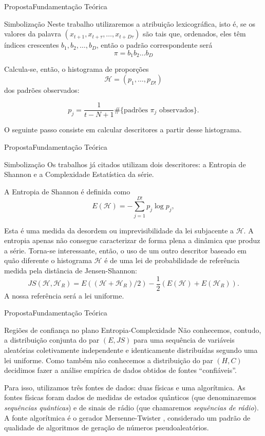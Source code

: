 \documentclass[10pt,xcolor={dvipsnames}]{beamer}
\begin{document}
\begin{frame}{Proposta}{Fundamentação Teórica}
\begin{block}{Simbolização}
	Neste trabalho utilizaremos a atribuição lexicográfica, isto é, se os valores da palavra $(x_{t+1},x_{t+\tau},\ldots, x_{t+D\tau})$ são tais que, ordenados, eles têm índices crescentes $b_1,b_2,\dots,b_D$, então o padrão correspondente será $$\pi=b_1b_2\dots b_D$$
	
	Calcula-se, então, o histograma de proporções $$\mathcal{H} =(p_1,\dots,p_{D!})$$ dos padrões observados:	
	\pause

		$$
		p_j = \frac{1}{t-N+1} \# \{
		\text{padrões } \pi_j \text{ observados}
		\}.
		$$
\pause

	O seguinte passo consiste em calcular descritores a partir desse histograma.
\end{block}
\end{frame}

\begin{frame}{Proposta}{Fundamentação Teórica}
\begin{block}{Simbolização}
Os trabalhos já citados utilizam dois descritores: a Entropia de Shannon e a Complexidade Estatística da série.

A Entropia de Shannon é definida como
$$
E(\mathcal H) = -\sum_{j=1}^{D!} p_j \log p_j,
$$

Esta é uma medida da desordem ou imprevisibilidade da lei subjacente a $\mathcal H$.
\pause
A entropia apenas não consegue caracterizar de forma plena a dinâmica que produz a série.
Torna-se interessante, então, o uso de um outro descritor baseado em quão diferente o histograma $\mathcal H$ é de uma lei de probabilidade de referência medida pela distância de Jensen-Shannon:
$$
JS(\mathcal H, \mathcal H_R) = E((\mathcal H+ \mathcal H_R)/2) -\frac{1}{2}(E(\mathcal H) + E(\mathcal H_R)).
$$
A nossa referência será a lei uniforme.
\end{block}
\end{frame}

\begin{frame}{Proposta}{Fundamentação Teórica}
	\begin{block}{Regiões de confiança no plano Entropia-Complexidade}
	Não conhecemos, contudo, a distribuição conjunta do par $(E,JS)$ para uma sequência de variáveis aleatórias coletivamente independente e identicamente distribuídas segundo uma lei uniforme.
	Como também não conhecemos a distribuição do par $(H,C)$ decidimos fazer a análise empírica de dados obtidos de fontes ``confiáveis''.
	\pause
	
	Para isso, utilizamos três fontes de dados: duas físicas e uma algorítmica.
	As fontes físicas foram dados de medidas de estados quânticos \cite{RNGVacuumStates} (que denominaremos \textit{sequências quânticas}) e de sinais de rádio \cite{RandomHostingAdvice} (que chamaremos \textit{sequências de rádio}).
	A fonte algorítmica é o gerador Mersenne-Twister \citep{Matsumoto98}, considerado um padrão de qualidade de algoritmos de geração de números pseudoaleatórios.
	\end{block}
\end{frame}
\end{document}

